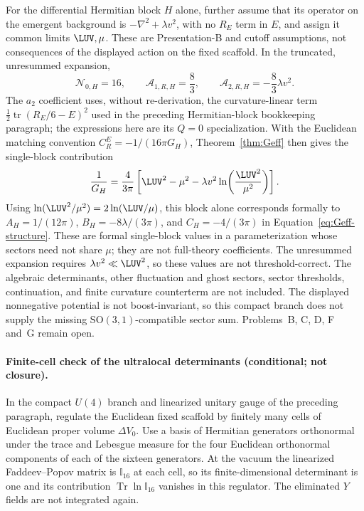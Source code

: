 For the differential Hermitian block \(H\) alone, further assume
that its operator on the emergent background is
\(-\nabla^2+\lambda v^2\), with no \(R_E\) term in \(E\), and assign
it common limits \(\LUV,\mu\). These are Presentation-B and cutoff
assumptions, not consequences of the displayed action on the fixed
scaffold. In the truncated, unresummed expansion,
\[
  \mathcal N_{0,H}=16,\qquad
  \mathcal A_{1,R,H}=\frac83,\qquad
  \mathcal A_{2,R,H}=-\frac83\lambda v^2 .
\]
The \(a_2\) coefficient uses, without re-derivation, the
curvature-linear term
\(\tfrac12\operatorname{tr}(R_E/6-E)^2\) used in the preceding
Hermitian-block bookkeeping paragraph; the expressions here are its
\(Q=0\) specialization. With the Euclidean matching convention
\(C_R^E=-1/(16\pi G_H)\), Theorem~\ref{thm:Geff} then gives the
single-block contribution
\[
  \frac1{G_H}
  =\frac{4}{3\pi}\left[
     \LUV^2-\mu^2
     -\lambda v^2\ln\!\left(\frac{\LUV^2}{\mu^2}\right)
   \right].
\]
Using \(\ln(\LUV^2/\mu^2)=2\ln(\LUV/\mu)\), this block alone
corresponds formally to
\(A_H=1/(12\pi)\), \(B_H=-8\lambda/(3\pi)\), and
\(C_H=-4/(3\pi)\) in Equation~\eqref{eq:Geff-structure}. These are
formal single-block values in a parameterization whose sectors need
not share \(\mu\); they are not full-theory coefficients. The
unresummed expansion requires \(\lambda v^2\ll\LUV^2\), so these
values are not threshold-correct. The algebraic determinants, other
fluctuation and ghost sectors, sector thresholds, continuation, and
finite curvature counterterm are not included. The displayed
nonnegative potential is not boost-invariant, so this compact branch
does not supply the missing \(\mathrm{SO}(3,1)\)-compatible sector
sum. Problems~B, C, D, F and~G remain open.

\paragraph{Finite-cell check of the ultralocal determinants
(conditional; not closure).}
In the compact \(U(4)\) branch and linearized unitary gauge of the
preceding paragraph, regulate the Euclidean fixed scaffold by finitely
many cells of Euclidean proper volume \(\Delta V_0\). Use a basis of
Hermitian generators orthonormal under the trace and Lebesgue measure
for the four Euclidean orthonormal components of each of the sixteen
generators. At the vacuum the linearized Faddeev--Popov matrix is
\(\mathbb I_{16}\) at each cell, so its finite-dimensional determinant
is one and its contribution \(\operatorname{Tr}\ln\mathbb I_{16}\)
vanishes in this regulator. The eliminated \(Y\) fields are not
integrated again.

